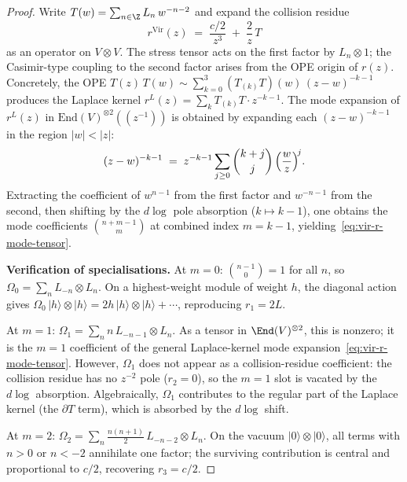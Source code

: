 \begin{proof}
Write $T(w) = \sum_{n \in \Z} L_n\, w^{-n-2}$ and expand the
collision residue
\[
 r^{\mathrm{Vir}}(z)
 \;=\;
 \frac{c/2}{z^3}
 \;+\;
 \frac{2}{z}\,T
\]
as an operator on $V \otimes V$. The stress tensor acts on
the first factor by $L_n \otimes 1$; the Casimir-type
coupling to the second factor arises from the OPE origin of
$r(z)$. Concretely, the OPE
$T(z)\,T(w) \sim \sum_{k=0}^{3} (T_{(k)}T)(w)\,(z{-}w)^{-k-1}$
produces the Laplace kernel
$r^L(z) = \sum_k T_{(k)}T\cdot z^{-k-1}$.
The mode expansion of $r^L(z)$ in
$\mathrm{End}(V)^{\otimes 2}((z^{-1}))$ is obtained by
expanding each $(z{-}w)^{-k-1}$ in the region $|w| < |z|$:
\[
 (z - w)^{-k-1}
 \;=\;
 z^{-k-1}
 \sum_{j \ge 0} \binom{k+j}{j}\,
 \Bigl(\frac{w}{z}\Bigr)^{\!j}.
\]
Extracting the coefficient of $w^{n-1}$ from the first factor
and $w^{-n-1}$ from the second, then shifting by the
$d\log$ pole absorption ($k \mapsto k - 1$), one obtains
the mode coefficients
$\binom{n + m - 1}{m}$ at combined index $m = k - 1$,
yielding~\eqref{eq:vir-r-mode-tensor}.

\medskip
\noindent\textbf{Verification of specialisations.}
At $m = 0$:
$\binom{n-1}{0} = 1$ for all $n$, so
$\Omega_0 = \sum_n L_{-n} \otimes L_n$.
On a highest-weight module of weight $h$, the diagonal
action gives
$\Omega_0\,|h\rangle \otimes |h\rangle
= 2h\,|h\rangle \otimes |h\rangle + \cdots$,
reproducing $r_1 = 2L$.

At $m = 1$:
$\Omega_1 = \sum_n n\, L_{-n-1} \otimes L_n$.
As a tensor in $\End(V)^{\otimes 2}$, this is nonzero;
it is the $m = 1$ coefficient of the general Laplace-kernel
mode expansion~\eqref{eq:vir-r-mode-tensor}.
However, $\Omega_1$ does not appear as a collision-residue
coefficient: the collision residue has no $z^{-2}$ pole
($r_2 = 0$), so the $m = 1$ slot is vacated by the $d\log$
absorption.
Algebraically, $\Omega_1$ contributes to the regular part
of the Laplace kernel (the $\partial T$ term), which is
absorbed by the $d\log$ shift.

At $m = 2$:
$\Omega_2 = \sum_n \frac{n(n+1)}{2}\,L_{-n-2} \otimes L_n$.
On the vacuum $|0\rangle \otimes |0\rangle$, all terms with
$n > 0$ or $n < -2$ annihilate one factor; the surviving
contribution is central and proportional to $c/2$,
recovering $r_3 = c/2$.
\end{proof}

